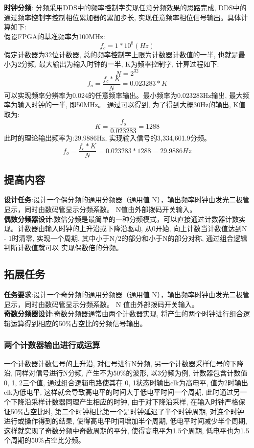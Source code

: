 \documentclass{article}
\begin{document}
\textbf{时钟分频}: 分频采用DDS中的频率控制字实现任意分频效果的思路完成, DDS中的通过频率控制字控制相位累加器的累加步长, 
实现任意频率相位信号输出。具体计算如下:\\
假设FPGA的基准频率为100MHz:
\begin{equation}
    f_c = 1*10^8 (Hz)
\end{equation}
假定计数器为32位计数器, 总的频率控制字上限为计数器计数值的一半, 也就是最小为2分频, 最大输出为输入时钟的一半, K为频率控制字, 计算过程如下:
\begin{equation}
    N = 2^{32}
\end{equation}
\begin{equation}
    f_o = \frac{f_c*K}{N} = 0.023283 * K
\end{equation}
可以实现频率分辨率为0.024的任意频率输出。最小频率为0.023283Hz输出, 最大频率为输入时钟的一半, 即50MHz。
通过可以得到, 为了得到大概30Hz的输出, K值取为:
\begin{equation}
    K = \frac{f_o}{0.023283} = 1288
\end{equation}
此时的理论输出频率为:29.9886Hz, 实现输入信号的3,334,601.9分频。
\begin{equation}
    f_o = \frac{f_c*K}{N} = 0.023283 * 1288 = 29.9886Hz
\end{equation}
\subsection*{提高内容}
\textbf{设计任务}:设计一个偶分频的通用分频器（通用值 N），输出频率时钟由发光二极管显示，同时由数码管显示分频系数。
N值由外部拨码开关输入。\\

\textbf{偶数分频器设计}:数倍分频是最简单的一种分频模式，可以直接通过计数器计数实现。计数器由输入时钟的上升沿或下降沿驱动, 
从0开始, 向上计数当计数值达到N - 1时清零, 实现一个周期, 其中小于N/2的部分和小于N的部分对称, 通过组合逻辑判断计数值就可以
实现偶数倍的分频。
\subsection*{拓展任务}
\textbf{任务要求}:设计一个奇分频的通用分频器（通用值 N），输出频率时钟由发光二极管显示，同时由数码管显示分频系数。
N 值由外部拨码开关输入。\\

\textbf{奇数分频器设计}:奇数分频器通常由两个计数器实现, 将产生的两个时钟进行组合逻辑运算得到相应的50\%占空比的分频信号输出。\\
\subsubsection*{两个计数器输出进行或运算}
一个计数器计数信号的上升沿, 对信号进行N分频, 另一个计数器采样信号的下降沿, 同样对信号进行N分频, 产生不为50\%的波形, 以3分频为例, 计数器包含计数值0, 1, 2三个值, 通过组合逻辑电路使其在
0, 1状态时输出clk为高电平, 值为2时输出clk为低电平, 这样就会导致高电平的时间大于低电平时间一个周期, 此时通过另一个下降沿采样计数器同理产生相应的时钟, 由于对下降沿采样, 在输入时钟严格保证50\%占空比时, 第二个时钟相比第一个是时钟延迟了半个时钟周期, 
对连个时钟进行或操作得到的结果, 使得高电平时间增加半个周期, 低电平时间减少半个周期, 这样就实现了奇数分频中奇数周期的平分, 使得高电平为1.5个周期, 低电平也为1.5个周期的50\%占空比分频。 
\end{document}
